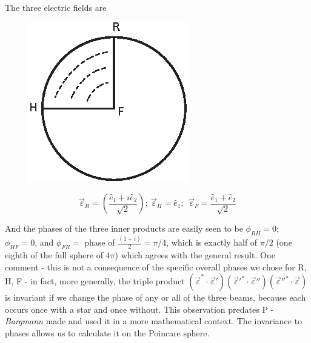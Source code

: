 The three electric fields are
\begin{figure}[H]
\centering
\includegraphics[scale=0.77]{src/images/chap26/11.eps}
\end{figure}
$$
\overrightarrow{\varepsilon}_R = \left(\frac{\hat{e}_1 + i \hat{e}_2}{\sqrt{2}} \right); ~ \overrightarrow{\varepsilon}_H = \hat{e}_1 ; ~~ \overrightarrow{\varepsilon}_F = \frac{\hat{e}_1  + \hat{e}_2}{\sqrt{2}}
$$

And the phases of the three inner products are easily seen to be $\phi_{RH} = 0$; $\phi_{HF} =0$, and $\phi_{FR} =$ phase of $\frac{(1+i)}{2} = \pi/4$, which is exactly half of $\pi/2$ (one eighth of the full sphere of $4\pi$) which agrees with the general result. One comment - this is not a consequence of the specific overall phases we chose for R, H, F - in fact, more generally, the triple product $(\overrightarrow{\varepsilon}^{\ast} \cdot \overrightarrow{\varepsilon}')(\overrightarrow{\varepsilon}'^{\ast} \cdot \overrightarrow{\varepsilon}'')(\overrightarrow{\varepsilon}''^{\ast} \cdot \overrightarrow{\varepsilon})$ is invariant if we change the phase of any or all of the three beams, because each occurs once with a star and once without. This observation predates P - \textit{Bargmann} made and used it in a more mathematical context. The invariance
to phases allows us to calculate it on the Poincare sphere.

